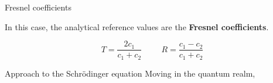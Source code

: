 \begin{frame}{Fresnel coefficients}
    \small

    In this case, the analytical reference values are the \textcolor{BrickRed}{\textbf{Fresnel coefficients}}.

    \normalsize

    \begin{equation*}
        T=\frac{2c_1}{c_1+c_2} \hspace{1cm} R=\frac{c_1-c_2}{c_1+c_2}
    \end{equation*}
\end{frame}

\begin{frame}{Approach to the Schrödinger equation}
    Moving in the quantum realm, 
\end{frame}